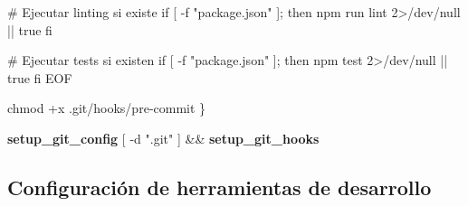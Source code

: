 \documentclass[
  11pt,
  letterpaper,
  oneside,
  openany]{scrbook}
\newenvironment{Shaded}{}{}
\newcommand{\BuiltInTok}[1]{\textcolor[rgb]{0.84,0.23,0.29}{#1}}
\newcommand{\ExtensionTok}[1]{\textcolor[rgb]{0.84,0.23,0.29}{\textbf{#1}}}
\newcommand{\FunctionTok}[1]{\textcolor[rgb]{0.44,0.26,0.76}{#1}}
\newcommand{\KeywordTok}[1]{\textcolor[rgb]{0.84,0.23,0.29}{#1}}
\newcommand{\NormalTok}[1]{\textcolor[rgb]{0.14,0.16,0.18}{#1}}
\newcommand{\OperatorTok}[1]{\textcolor[rgb]{0.14,0.16,0.18}{#1}}
\newcommand{\OtherTok}[1]{\textcolor[rgb]{0.44,0.26,0.76}{#1}}
\newcommand{\StringTok}[1]{\textcolor[rgb]{0.01,0.18,0.38}{#1}}
\begin{document}
\begin{Shaded}
\begin{Highlighting}[]
\StringTok{\# Ejecutar linting si existe}
\StringTok{if [ {-}f "package.json" ]; then}
\StringTok{    npm run lint 2\textgreater{}/dev/null || true}
\StringTok{fi}

\StringTok{\# Ejecutar tests si existen}
\StringTok{if [ {-}f "package.json" ]; then}
\StringTok{    npm test 2\textgreater{}/dev/null || true}
\StringTok{fi}
\OperatorTok{EOF}

    \FunctionTok{chmod}\NormalTok{ +x .git/hooks/pre{-}commit}
\KeywordTok{\}}

\ExtensionTok{setup\_git\_config}
\BuiltInTok{[} \OtherTok{{-}d} \StringTok{".git"} \BuiltInTok{]} \KeywordTok{\&\&} \ExtensionTok{setup\_git\_hooks}
\end{Highlighting}
\end{Shaded}

\subsection{Configuración de herramientas de
desarrollo}\label{configuraciuxf3n-de-herramientas-de-desarrollo}
\end{document}
